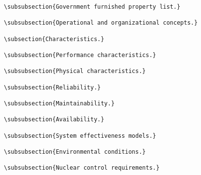 \begin{itemize}
\begin{small}
\begin{verbatim}
\subsubsection{Government furnished property list.}

\subsubsection{Operational and organizational concepts.}

\subsection{Characteristics.}

\subsubsection{Performance characteristics.}

\subsubsection{Physical characteristics.}

\subsubsection{Reliability.}

\subsubsection{Maintainability.}

\subsubsection{Availability.}

\subsubsection{System effectiveness models.}

\subsubsection{Environmental conditions.}

\subsubsection{Nuclear control requirements.}


\end{verbatim}
\end{small}
\end{itemize}
